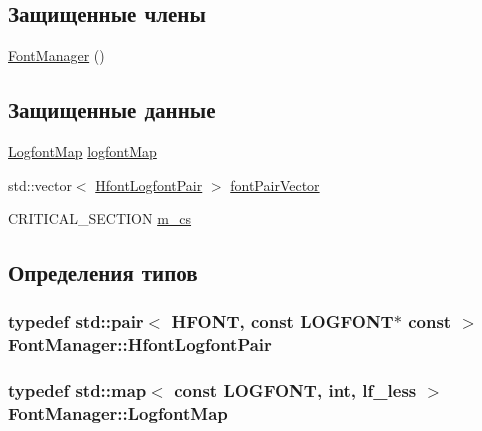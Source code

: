\subsection*{Защищенные члены}
\begin{DoxyCompactItemize}
\item 
\hyperlink{class_font_manager_a2f89acd28b5bd24e747aacd3208131ef}{Font\-Manager} ()
\end{DoxyCompactItemize}
\subsection*{Защищенные данные}
\begin{DoxyCompactItemize}
\item 
\hyperlink{class_font_manager_a053e5dac54d91800c691c093e191d17c}{Logfont\-Map} \hyperlink{class_font_manager_a8834f43163db4be815db7a2cb236a36e}{logfont\-Map}
\item 
std\-::vector$<$ \hyperlink{class_font_manager_ae5b94ccffd33a60792fc6a2731e48e5f}{Hfont\-Logfont\-Pair} $>$ \hyperlink{class_font_manager_aa50d6f013a9f72cc63a33370a5ee87d7}{font\-Pair\-Vector}
\item 
C\-R\-I\-T\-I\-C\-A\-L\-\_\-\-S\-E\-C\-T\-I\-O\-N \hyperlink{class_font_manager_ae59f42d519931bb99c3a1caaf7d560c0}{m\-\_\-cs}
\end{DoxyCompactItemize}


\subsection{Определения типов}
\hypertarget{class_font_manager_ae5b94ccffd33a60792fc6a2731e48e5f}{
\subsubsection[{Hfont\-Logfont\-Pair}]{\setlength{\rightskip}{0pt plus 5cm}typedef std\-::pair$<$ H\-F\-O\-N\-T, const L\-O\-G\-F\-O\-N\-T$\ast$ const $>$ {\bf Font\-Manager\-::\-Hfont\-Logfont\-Pair}\hspace{0.3cm}{\ttfamily [protected]}}}\label{class_font_manager_ae5b94ccffd33a60792fc6a2731e48e5f}
\hypertarget{class_font_manager_a053e5dac54d91800c691c093e191d17c}{
\subsubsection[{Logfont\-Map}]{\setlength{\rightskip}{0pt plus 5cm}typedef std\-::map$<$ const L\-O\-G\-F\-O\-N\-T, int, {\bf lf\-\_\-less} $>$ {\bf Font\-Manager\-::\-Logfont\-Map}\hspace{0.3cm}{\ttfamily [protected]}}}\label{class_font_manager_a053e5dac54d91800c691c093e191d17c}


